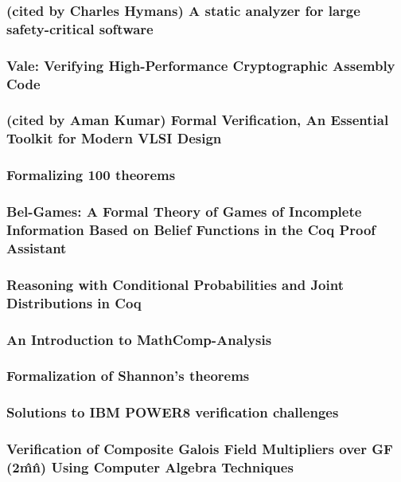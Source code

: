 \documentclass{article}
\begin{document}
\subsubsection{(cited by Charles Hymans) A static analyzer for large safety-critical software}


\subsubsection{Vale: Verifying {High-Performance} Cryptographic Assembly Code}

\subsubsection{(cited by Aman Kumar) Formal Verification, An Essential Toolkit for Modern VLSI Design} 

\subsubsection{Formalizing 100 theorems}

\subsubsection{Bel-Games: A Formal Theory of Games of Incomplete Information Based on Belief Functions in the Coq Proof Assistant}

\subsubsection{Reasoning with Conditional Probabilities and Joint Distributions in Coq}

\subsubsection{An Introduction to MathComp-Analysis}

\subsubsection{Formalization of Shannon’s theorems}

\subsubsection{Solutions to IBM POWER8 verification challenges}

\subsubsection{Verification of Composite Galois Field Multipliers over GF (2\^m\^n) Using Computer Algebra Techniques}
\end{document}
